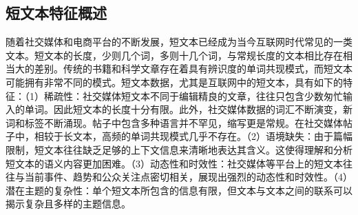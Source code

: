 \subsection{短文本特征概述}
随着社交媒体和电商平台的不断发展，短文本已经成为当今互联网时代常见的一类文本。短文本的长度，少则几个词，多则十几个词，与常规长度的文本相比存在相当大的差别。传统的书籍和科学文章存在着具有辨识度的单词共现模式，而短文本可能拥有非常不同的模式\cite{survey_2023}。短文本数据，尤其是互联网中的短文本，具有如下的特征：（1）稀疏性：社交媒体短文本不同于编辑精良的文章，往往只包含少数匆忙输入的单词。因此短文本的长度十分有限。此外，社交媒体数据的词汇不断演变，新词和标签不断涌现。帖子中包含多种语言并不罕见，缩写更是常规。在社交媒体帖子中，相较于长文本，高频的单词共现模式几乎不存在。（2）语境缺失：由于篇幅限制，短文本往往缺乏足够的上下文信息来清晰地表达其含义。这使得理解和分析短文本的语义内容更加困难。（3）动态性和时效性：社交媒体等平台上的短文本往往与当前事件、趋势和公众关注点密切相关，展现出强烈的动态性和时效性。（4）潜在主题的复杂性：单个短文本所包含的信息有限，但文本与文本之间的联系可以揭示复杂且多样的主题信息。


